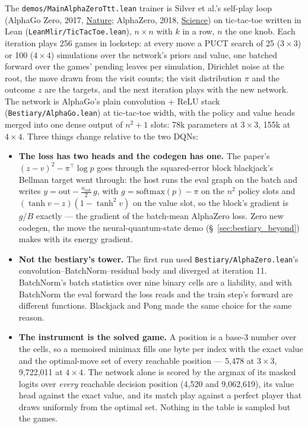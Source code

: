 The \texttt{demos/MainAlphaZeroTtt.lean}
trainer is Silver et al.'s self-play loop (AlphaGo Zero, 2017,
\href{https://www.nature.com/articles/nature24270}{Nature}; AlphaZero, 2018,
\href{https://www.science.org/doi/10.1126/science.aar6404}{Science}) on tic-tac-toe
written in Lean (\texttt{LeanMlir/TicTacToe.lean}), $n \times n$ with $k$ in a row,
$n$ the one knob. Each iteration plays 256 games in lockstep: at every move a PUCT
search of 25 ($3 \times 3$) or 100 ($4 \times 4$) simulations over the network's
priors and value, one batched forward over the games' pending leaves per simulation,
Dirichlet noise at the root, the move drawn from the visit counts; the visit
distribution $\pi$ and the outcome $z$ are the targets, and the next iteration plays
with the new network. The network is AlphaGo's plain convolution + ReLU stack
(\texttt{Bestiary/AlphaGo.lean}) at tic-tac-toe width, with the policy and value
heads merged into one dense output of $n^2 + 1$ slots: 78k parameters at
$3 \times 3$, 155k at $4 \times 4$. Three things change relative to the two DQNs:

\begin{itemize}
  \item \textbf{The loss has two heads and the codegen has one.} The paper's
    $(z - v)^2 - \pi^{\top} \log p$ goes through the squared-error block blackjack's
    Bellman target went through: the host runs the eval graph on the batch and writes
    $y = \mathrm{out} - \tfrac{n_{\mathrm{out}}}{2}\, g$, with
    $g = \mathrm{softmax}(p) - \pi$ on the $n^2$ policy slots and
    $(\tanh v - z)(1 - \tanh^2 v)$ on the value slot, so the block's gradient is
    $g / B$ exactly --- the gradient of the batch-mean AlphaZero loss. Zero new
    codegen, the move the neural-quantum-state demo (\S~\ref{sec:bestiary_beyond})
    makes with its energy gradient.
  \item \textbf{Not the bestiary's tower.} The first run used
    \texttt{Bestiary/AlphaZero.lean}'s convolution--BatchNorm--residual body and
    diverged at iteration 11. BatchNorm's batch statistics over nine binary cells
    are a liability, and with BatchNorm the eval forward the loss reads and the
    train step's forward are different functions. Blackjack and Pong made the same
    choice for the same reason.
  \item \textbf{The instrument is the solved game.} A position is a base-3 number
    over the cells, so a memoised minimax fills one byte per index with the exact
    value and the optimal-move set of every reachable position --- 5,478 at
    $3 \times 3$, 9,722,011 at $4 \times 4$. The network alone is scored by the
    argmax of its masked logits over \emph{every} reachable decision position (4,520
    and 9,062,619), its value head against the exact value, and its match play
    against a perfect player that draws uniformly from the optimal set. Nothing in
    the table is sampled but the games.
\end{itemize}

